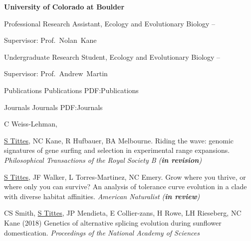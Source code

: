 \documentclass[letterpaper,MMMyyyy,nonstopmode]{simpleresumecv}
\begin{document}
\begin{Body}
\Entry
{\textbf{University of Colorado at Boulder}}

\Gap
\BulletItem
Professional Research Assistant, Ecology and Evolutionary Biology
\hfill
{} --
\begin{Detail}
Supervisor:
Prof.~Nolan~Kane
\end{Detail}

\Entry

\Gap
\BulletItem
Undergraduate Research Student, Ecology and Evolutionary Biology
\hfill
{} --
\begin{Detail}
Supervisor:
Prof.~Andrew~Martin
\end{Detail}


\Section
{Publications}
{Publications}
{PDF:Publications}

\SubSection
{Journals}
{Journals}
{PDF:Journals}

\begingroup
\renewcommand{\MaxNumberedItem}{[300]}


\Gap
\NumberedItem{[9]}
C Weiss-Lehman, {\underline{S Tittes}, NC Kane, R Hufbauer, BA Melbourne.
Riding the wave: genomic signatures of gene surfing and selection in experimental range expansions.
\textit{Philosophical Transactions of the Royal Society B (\textbf{in revision})}

\Gap
\NumberedItem{[8]}
{\underline{S Tittes}, JF Walker, L Torres-Martinez, NC Emery.
Grow where you thrive, or where only you can survive? An analysis of tolerance curve evolution in a clade with diverse habitat affinities.
\textit{American Naturalist (\textbf{in review})}}


\Gap
\NumberedItem{[7]}
CS Smith, {\underline{S Tittes}, JP Mendieta, E Collier-zans, H Rowe, LH  Rieseberg, NC Kane 
(2018)
Genetics of alternative splicing evolution during sunflower domestication.
\textit{Proceedings of the National Academy of Sciences}}


}
\end{Body}
\end{document}
